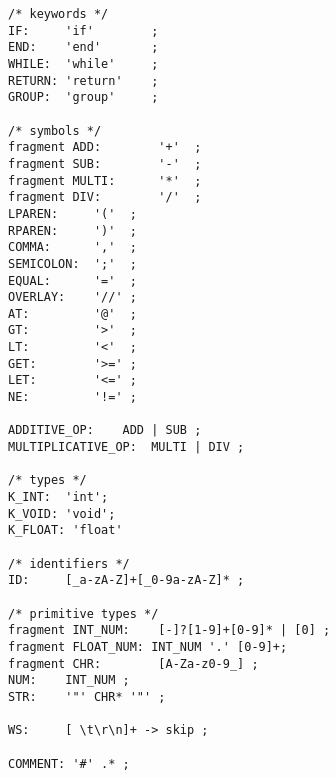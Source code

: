 \documentclass[11pt,letterpaper]{article}
\begin{document}
\begin{lstlisting}[tabsize=4, ]
/* keywords */
IF:     'if'        ;
END:    'end'       ;
WHILE:  'while'     ;
RETURN: 'return'    ;
GROUP:  'group'     ;

/* symbols */
fragment ADD:        '+'  ;
fragment SUB:        '-'  ;
fragment MULTI:      '*'  ;
fragment DIV:        '/'  ;
LPAREN:     '('  ;
RPAREN:     ')'  ;
COMMA:      ','  ;
SEMICOLON:  ';'  ;
EQUAL:      '='  ;
OVERLAY:    '//' ;
AT:         '@'  ;
GT:         '>'  ;
LT:         '<'  ;
GET:        '>=' ;
LET:        '<=' ;
NE:         '!=' ;

ADDITIVE_OP:    ADD | SUB ;
MULTIPLICATIVE_OP:  MULTI | DIV ;

/* types */
K_INT:  'int';
K_VOID: 'void';
K_FLOAT: 'float'

/* identifiers */
ID:     [_a-zA-Z]+[_0-9a-zA-Z]* ;   

/* primitive types */
fragment INT_NUM:    [-]?[1-9]+[0-9]* | [0] ;    
fragment FLOAT_NUM: INT_NUM '.' [0-9]+; 
fragment CHR:        [A-Za-z0-9_] ;
NUM:    INT_NUM ;
STR:    '"' CHR* '"' ;

WS:     [ \t\r\n]+ -> skip ;

COMMENT: '#' .* ;
\end{lstlisting}	
\end{document}
